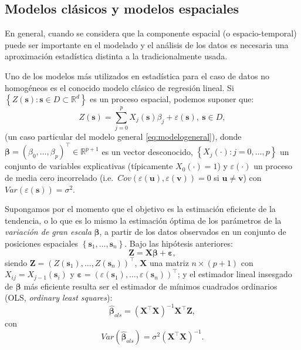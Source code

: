 \documentclass[
  spanish,
]{book}
\theoremstyle{break}
\theoremstyle{definition}
\theoremstyle{definition}
\theoremstyle{definition}
\theoremstyle{definition}
\theoremstyle{remark}
\begin{document}
\hypertarget{modelos-clasicos-espaciales}{%
\subsection{Modelos clásicos y modelos espaciales}\label{modelos-clasicos-espaciales}}

En general, cuando se considera que la componente espacial (o espacio-temporal) puede ser importante en el modelado y el análisis de los datos es necesaria una aproximación estadística distinta a la tradicionalmente usada.

Uno de los modelos más utilizados en estadística para el caso de datos no homogéneos es el conocido modelo clásico de regresión lineal.
Si \(\left\{ Z(\mathbf{s}):\mathbf{s}\in D\subset \mathbb{R}^{d} \right\}\) es un proceso espacial, podemos suponer que:
\[Z(\mathbf{s})=\sum\limits_{j=0}^{p}X_{j}(\mathbf{s})\beta_{j} +\varepsilon(\mathbf{s}),\ \mathbf{s}\in D,\]
(un caso particular del modelo general \eqref{eq:modelogeneral}), donde \(\boldsymbol{\beta }=(\beta_{0}, \ldots,\beta_{p})^{\top}\in \mathbb{R}^{p+1}\) es un vector desconocido, \(\left\{ X_{j} (\cdot):j=0, \ldots,p\right\}\) un conjunto de variables explicativas (típicamente \(X_0(\cdot)=1\)) y \(\varepsilon(\cdot)\) un proceso de media cero incorrelado (i.e.~\(Cov(\varepsilon (\mathbf{u}),\varepsilon (\mathbf{v}))=0\) si \(\mathbf{u}\neq \mathbf{v}\)) con \(Var(\varepsilon (\mathbf{s}))=\sigma^{2}\).

Supongamos por el momento que el objetivo es la estimación eficiente de la tendencia, o lo que es lo mismo la estimación óptima de los parámetros de la \emph{variación de gran escala} \(\boldsymbol{\beta}\), a partir de los datos observados en un conjunto de posiciones espaciales \(\left\{ \mathbf{s}_{1}, \ldots,\mathbf{s}_{n} \right\}\).
Bajo las hipótesis anteriores:
\[\mathbf{Z} = \mathbf{X}\boldsymbol{\beta} + \boldsymbol{\varepsilon},\]
siendo \(\mathbf{Z}=\left( Z(\mathbf{s}_{1}), \ldots,Z(\mathbf{s}_{n}) \right)^{\top}\), \(\mathbf{X}\) una matriz \(n\times (p+1)\) con \(X_{ij}=X_{j-1}(\mathbf{s}_{i})\) y \(\boldsymbol{\varepsilon} = \left( \varepsilon (\mathbf{s}_{1}), \ldots,\varepsilon (\mathbf{s}_{n})\right)^{\top}\); y el estimador lineal insesgado de \(\boldsymbol{\beta}\) más eficiente resulta ser el estimador de mínimos cuadrados ordinarios (OLS, \emph{ordinary least squares}):
\begin{equation} 
  \hat{\boldsymbol{\beta}}_{ols}=(\mathbf{X}^{\top}\mathbf{X})^{-1}\mathbf{X}^{\top}\mathbf{Z},
  \label{eq:beta-ols}
\end{equation}
con \[Var(\hat{\boldsymbol{\beta}}_{ols})=\sigma^{2}(\mathbf{X}^{\top}\mathbf{X})^{-1}.\]
\end{document}
